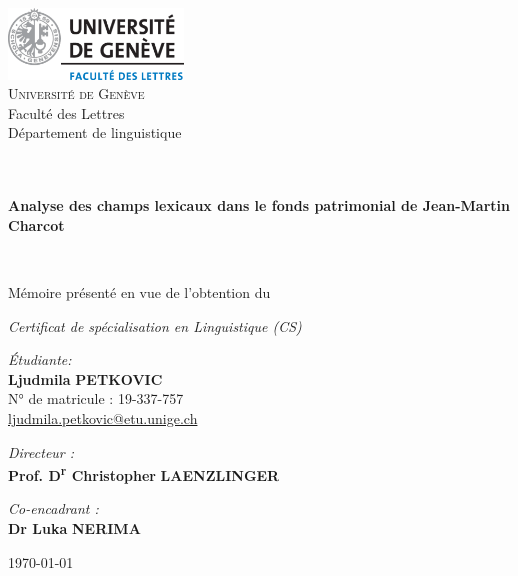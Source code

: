 \begin{titlepage}
\begin{center}

\includegraphics[width=0.35\textwidth]{img/unige_lettres_logo.png}~\\[1cm]

\Large \textsc{Université de Genève}\\Faculté des Lettres\\
Département de linguistique

\textsc{\Large }\\[0.5cm]

\HRule \\[0.4cm]

{\huge \bfseries Analyse des champs lexicaux dans le fonds patrimonial de Jean-Martin Charcot \\[0.4cm] }

\HRule \\[1.5cm]
\large{Mémoire présenté en vue de l’obtention du\medskip

\Large \textit{Certificat de spécialisation en Linguistique (CS)}\vspace{2cm}}

\begin{minipage}{1\textwidth}
\begin{flushleft} \large
\emph{Étudiante:}\\
\textbf{Ljudmila} \textsc{\textbf{PETKOVIC}}\\
\small{N° de matricule : 19-337-757\\\href{mailto:ljudmila.petkovic@etu.unige.ch}{ljudmila.petkovic@etu.unige.ch}}
\end{flushleft}
\end{minipage}
\begin{minipage}{1\textwidth}
\begin{flushright} \large
\emph{Directeur :} \\
\textbf{Prof. D\textsuperscript{r} Christopher} \textsc{\textbf{LAENZLINGER}}

\medskip
\emph{Co-encadrant :} \\
\textbf{Dr Luka} \textsc{\textbf{NERIMA}}
\end{flushright}
\end{minipage}

\vfill

{\large \today}

\end{center}
\end{titlepage}